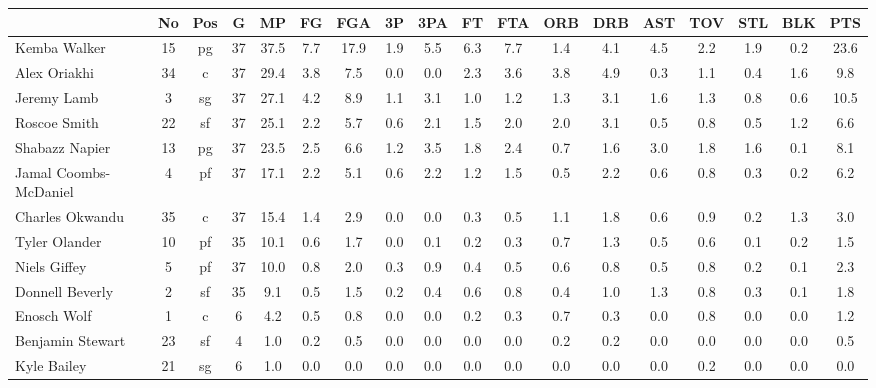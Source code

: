 \documentclass[10pt,letterpaper]{article}
\begin{document}
\begin{table}[ht]
\begin{center}
\begin{tabular}{lccccccccccccccccc}
  \hline
 & No & Pos & G & MP & FG & FGA & 3P & 3PA & FT & FTA & ORB & DRB & AST & TOV & STL & BLK & PTS \\ 
  \hline
Kemba Walker & 15 & pg & 37 & 37.5 & 7.7 & 17.9 & 1.9 & 5.5 & 6.3 & 7.7 & 1.4 & 4.1 & 4.5 & 2.2 & 1.9 & 0.2 & 23.6 \\ 
  Alex Oriakhi & 34 & c & 37 & 29.4 & 3.8 & 7.5 & 0.0 & 0.0 & 2.3 & 3.6 & 3.8 & 4.9 & 0.3 & 1.1 & 0.4 & 1.6 & 9.8 \\ 
  Jeremy Lamb & 3 & sg & 37 & 27.1 & 4.2 & 8.9 & 1.1 & 3.1 & 1.0 & 1.2 & 1.3 & 3.1 & 1.6 & 1.3 & 0.8 & 0.6 & 10.5 \\ 
  Roscoe Smith & 22 & sf & 37 & 25.1 & 2.2 & 5.7 & 0.6 & 2.1 & 1.5 & 2.0 & 2.0 & 3.1 & 0.5 & 0.8 & 0.5 & 1.2 & 6.6 \\ 
  Shabazz Napier & 13 & pg & 37 & 23.5 & 2.5 & 6.6 & 1.2 & 3.5 & 1.8 & 2.4 & 0.7 & 1.6 & 3.0 & 1.8 & 1.6 & 0.1 & 8.1 \\ 
  Jamal Coombs-McDaniel & 4 & pf & 37 & 17.1 & 2.2 & 5.1 & 0.6 & 2.2 & 1.2 & 1.5 & 0.5 & 2.2 & 0.6 & 0.8 & 0.3 & 0.2 & 6.2 \\ 
  Charles Okwandu & 35 & c & 37 & 15.4 & 1.4 & 2.9 & 0.0 & 0.0 & 0.3 & 0.5 & 1.1 & 1.8 & 0.6 & 0.9 & 0.2 & 1.3 & 3.0 \\ 
  Tyler Olander & 10 & pf & 35 & 10.1 & 0.6 & 1.7 & 0.0 & 0.1 & 0.2 & 0.3 & 0.7 & 1.3 & 0.5 & 0.6 & 0.1 & 0.2 & 1.5 \\ 
  Niels Giffey & 5 & pf & 37 & 10.0 & 0.8 & 2.0 & 0.3 & 0.9 & 0.4 & 0.5 & 0.6 & 0.8 & 0.5 & 0.8 & 0.2 & 0.1 & 2.3 \\ 
  Donnell Beverly & 2 & sf & 35 & 9.1 & 0.5 & 1.5 & 0.2 & 0.4 & 0.6 & 0.8 & 0.4 & 1.0 & 1.3 & 0.8 & 0.3 & 0.1 & 1.8 \\ 
  Enosch Wolf & 1 & c & 6 & 4.2 & 0.5 & 0.8 & 0.0 & 0.0 & 0.2 & 0.3 & 0.7 & 0.3 & 0.0 & 0.8 & 0.0 & 0.0 & 1.2 \\ 
  Benjamin Stewart & 23 & sf & 4 & 1.0 & 0.2 & 0.5 & 0.0 & 0.0 & 0.0 & 0.0 & 0.2 & 0.2 & 0.0 & 0.0 & 0.0 & 0.0 & 0.5 \\ 
  Kyle Bailey & 21 & sg & 6 & 1.0 & 0.0 & 0.0 & 0.0 & 0.0 & 0.0 & 0.0 & 0.0 & 0.0 & 0.0 & 0.2 & 0.0 & 0.0 & 0.0 \\ 
   \hline
\end{tabular}
\end{center}
\end{table}
\end{document}
